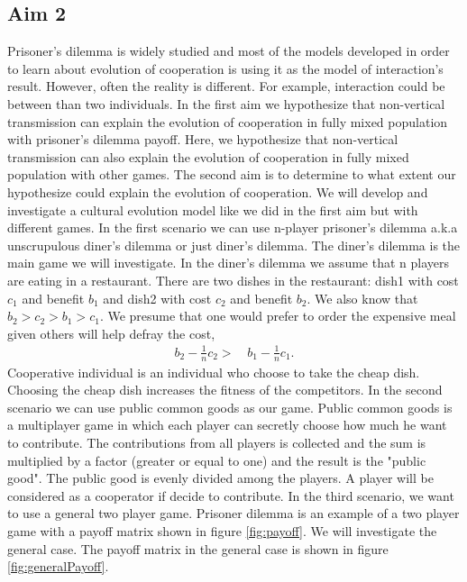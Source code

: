 \documentclass{article}
\begin{document}
\subsection*{Aim 2}
Prisoner's dilemma is widely studied and most of the models developed in order to learn about evolution of cooperation is using it as the model of interaction's result. However, often the reality is different. For example, interaction could be between than two individuals. 
In the first aim we hypothesize that non-vertical transmission can explain the evolution of cooperation in fully mixed population with prisoner's dilemma payoff. Here, we hypothesize that non-vertical transmission can also explain the evolution of cooperation in fully mixed population with other games. The second aim is to determine to what extent our hypothesize could explain the evolution of cooperation. We will develop and investigate a cultural evolution model like we did in the first aim but with different games. 
In the first scenario we can use n-player prisoner's dilemma a.k.a unscrupulous diner's dilemma or just diner's dilemma. The diner's dilemma is the main game we will investigate. In the diner's dilemma we assume that n players are eating in a restaurant. There are two dishes in the restaurant: dish1 with cost $c_1$ and benefit $b_1$ and dish2 with cost $c_2$ and benefit $b_2$. We also know that $b_2>c_2>b_1>c_1$. We presume that one would prefer to order the expensive meal given others will help defray the cost,
\begin{equation} 
\begin{split} \label{diner}
b_2-\frac{1}{n}c_2 >\, & b_1 - \frac{1}{n}c_1.
\end {split}
\end{equation}
Cooperative individual is an individual who choose to take the cheap dish. Choosing the cheap dish increases the fitness of the competitors. 
In the second scenario we can use public common goods as our game. Public common goods is a multiplayer game in which each player can secretly choose how much he want to contribute. The contributions from all players is collected and the sum is multiplied by a factor (greater or equal to one) and the result is the "public good". The public good is evenly divided among the players. A player will be considered as a cooperator if decide to contribute. 
In the third scenario, we want to use a general two player game. Prisoner dilemma is an example of a two player game with a payoff matrix shown in figure \ref{fig:payoff}. We will investigate the general case. The payoff matrix in the general case is shown in figure \ref{fig:generalPayoff}.
\end{document}
